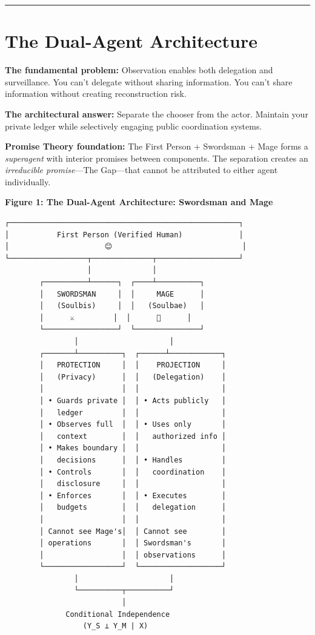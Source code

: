 \documentclass[
  11pt,
]{article}
\begin{document}
\begin{center}\rule{0.5\linewidth}{0.5pt}\end{center}

\section{The Dual-Agent Architecture}\label{the-dual-agent-architecture}

\textbf{The fundamental problem:} Observation enables both delegation
and surveillance. You can't delegate without sharing information. You
can't share information without creating reconstruction risk.

\textbf{The architectural answer:} Separate the chooser from the actor.
Maintain your private ledger while selectively engaging public
coordination systems.

\textbf{Promise Theory foundation:} The First Person + Swordsman + Mage
forms a \emph{superagent} with interior promises between components. The
separation creates an \emph{irreducible promise}---The Gap---that cannot
be attributed to either agent individually.

\textbf{Figure 1: The Dual-Agent Architecture: Swordsman and Mage}

\begin{verbatim}
┌─────────────────────────────────────────────────────┐
│           First Person (Verified Human)             │
│                      😊                              │
└──────────────────┬──────────────┬───────────────────┘
                   │              │
        ┌──────────┴──────┐  ┌────┴──────────┐
        │   SWORDSMAN     │  │     MAGE      │
        │   (Soulbis)     │  │   (Soulbae)   │
        │      ⚔️         │  │      🧙      │
        └─────────────────┘  └───────────────┘
                │                     │
        ┌───────┴──────────┐  ┌──────┴────────────┐
        │   PROTECTION     │  │    PROJECTION     │
        │   (Privacy)      │  │   (Delegation)    │
        │                  │  │                   │
        │ • Guards private │  │ • Acts publicly   │
        │   ledger         │  │                   │
        │ • Observes full  │  │ • Uses only       │
        │   context        │  │   authorized info │
        │ • Makes boundary │  │                   │
        │   decisions      │  │ • Handles         │
        │ • Controls       │  │   coordination    │
        │   disclosure     │  │                   │
        │ • Enforces       │  │ • Executes        │
        │   budgets        │  │   delegation      │
        │                  │  │                   │
        │ Cannot see Mage's│  │ Cannot see        │
        │ operations       │  │ Swordsman's       │
        │                  │  │ observations      │
        └──────────────────┘  └───────────────────┘
                │                     │
                └──────────┬──────────┘
                           │
              Conditional Independence
                  (Y_S ⊥ Y_M | X)
\end{verbatim}
\end{document}
